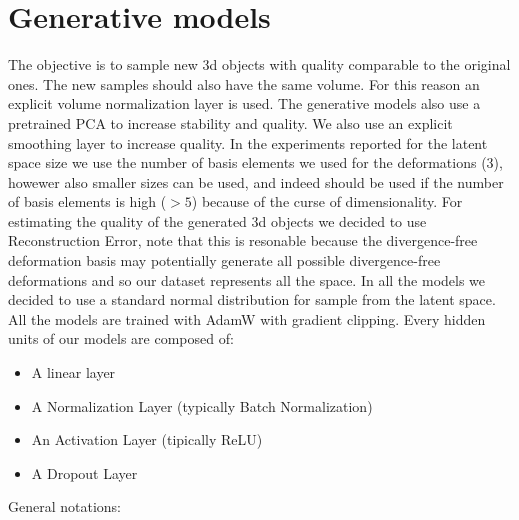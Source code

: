 \documentclass{article}
\begin{document}
\section{Generative models}
The objective is to sample new 3d objects with quality comparable to the original ones. The new samples should also have the same volume.
For this reason an explicit volume normalization layer is used.
The generative models also use a pretrained PCA to increase stability and quality.
We also use an explicit smoothing layer to increase quality.
In the experiments reported for the latent space size we use the number of basis elements we used for the deformations (3), howewer also smaller sizes can be used, and indeed should be used if the number of basis elements is high ($>5$) because of the curse of dimensionality.  
For estimating the quality of the generated 3d objects we decided to use Reconstruction Error, note that this is resonable because the divergence-free deformation basis may potentially generate all possible divergence-free deformations and so our dataset represents all the space.
In all the models we decided to use a standard normal distribution for sample from the latent space.\\
All the models are trained with AdamW with gradient clipping.
Every hidden units of our models are composed of:
\begin{itemize}
\item A linear layer
\item A Normalization Layer (typically Batch Normalization)
\item An Activation Layer (tipically ReLU)
\item A Dropout Layer
\end{itemize}
$ $\\
General notations:
\end{document}
